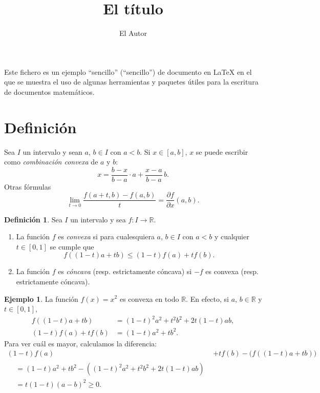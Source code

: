 \documentclass[11pt]{article}
\author{El Autor}
\title{El título}
\numberwithin{equation}{section} %
\theoremstyle{plain}                            %
\theoremstyle{definition}                       %
\newtheorem{definicion}[teorema]{Definición}
\newtheorem{ejemplo}[teorema]{Ejemplo}
\theoremstyle{remark}                           %
\begin{document}
\maketitle

Este fichero es un ejemplo \enquote{sencillo} (``sencillo'') de documento en \LaTeX{} en el que se muestra el uso de algunas herramientas y paquetes útiles para la escritura de documentos matemáticos. 


\section{Definición}

Sea $I$ un intervalo y sean $a$, $b \in I$ con $a<b$. Si $x\in [a,b]$, $x$ se puede escribir como \emph{combinación convexa} de $a$ y $b$:
\[
      x= \frac{b-x}{b-a}\cdot a + \frac{x-a}{b-a}\, b.
\]
Otras fórmulas
\[
      \lim_{t \to 0} \frac{f(a+t,b)-f(a,b)}{t}= \frac{\partial f}{\partial x}(a,b).
\]



\begin{definicion}\label{def:convexa}
      Sea $I$ un intervalo y sea $f \colon I \rightarrow \mathbb{R}$.
      \begin{enumerate}
            \item La función $f$ es \emph{convexa} si para cualesquiera $a$, $b \in I$ con $a<b$ y cualquier $t \in [0,1]$ se cumple que
                  \[
                        f\left((1-t)a+tb\right) \leq (1-t)f(a)+tf(b).
                  \]
            \item La función $f$ es \emph{cóncava} (resp. estrictamente cóncava) si $-f$ es convexa (resp. estrictamente cóncava).
      \end{enumerate}
\end{definicion}

\begin{ejemplo}
      La función $f(x)=x^2$ es convexa en todo $\mathbb{R}$. En efecto, si $a$, $b \in \mathbb{R}$ y $t \in [0,1]$,
      \begin{align*}
            f\left( (1-t)a+tb \right) & = (1-t)^2 a^{2}+t^{2}b^{2} +2t(1-t)ab, \\
            (1-t)f(a)+tf(b)           & = (1-t)a^2+tb^2.
      \end{align*}
      Para ver cuál es mayor, calculamos la diferencia:
      \begin{align*}
            (1-t)f(a) & +tf(b)  - \bigl( f\left( (1-t)a+tb \right) \bigr) \\
            \begin{split}
                   & = (1-t)a^2+tb^2 - \left( (1-t)^2 a^{2}+t^{2}b^{2} +2t(1-t)ab \right) \\
                   & = t(1-t) \left( a-b \right)^2 \geq 0.
            \end{split}
      \end{align*}
\end{ejemplo}
\end{document}
